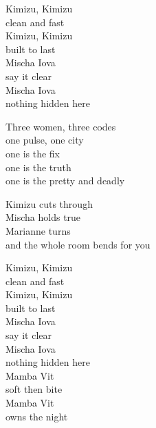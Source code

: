\begin{lyrics}
Kimizu, Kimizu\\
clean and fast\\
Kimizu, Kimizu\\
built to last\\
Mischa Iova\\
say it clear\\
Mischa Iova\\
nothing hidden here

Three women, three codes\\
one pulse, one city\\
one is the fix\\
one is the truth\\
one is the pretty and deadly

Kimizu cuts through\\
Mischa holds true\\
Marianne turns\\
and the whole room bends for you

Kimizu, Kimizu\\
clean and fast\\
Kimizu, Kimizu\\
built to last\\
Mischa Iova\\
say it clear\\
Mischa Iova\\
nothing hidden here\\
Mamba Vit\\
soft then bite\\
Mamba Vit\\
owns the night

\end{lyrics}

